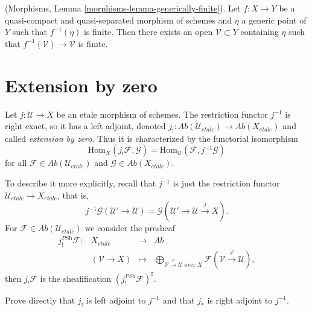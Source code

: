 \begin{lemma}
\label{lemma-generically-finite}
(Morphisms, Lemma \ref{morphisms-lemma-generically-finite}).
Let $f: X\to Y$ be a quasi-compact and quasi-separated morphism of schemes and
$\eta$ a generic point of $Y$ such that $f^{-1}(\eta)$ is finite. Then there
exists an open $\mathcal{V} \subset Y$ containing $\eta$ such that
$f^{-1}(\mathcal{V})\to \mathcal{V}$ is finite.
\end{lemma}






\section{Extension by zero}
\label{section-extension-by-zero}

\begin{definition}
\label{definition-extension-zero}
Let $j: \mathcal{U} \to X$ be an etale morphism of schemes. The restriction
functor $j^{-1}$ is right exact, so it has a left adjoint, denoted
$j_! : \textit{Ab}(\mathcal{U}_{etale})\to \textit{Ab}(X_{etale})$
and called {\it extension by zero}.
Thus it is characterized by the functorial isomorphism
$$
\text{Hom}_X(j_!\mathcal{F}, \mathcal{G}) =
\text{Hom}_\mathcal{U}(\mathcal{F}, j^{-1}\mathcal{G})
$$
for all $\mathcal{F} \in \textit{Ab}(\mathcal{U}_{etale})$ and
$\mathcal{G} \in \textit{Ab}(X_{etale})$.
\end{definition}

\noindent
To describe it more explicitly, recall that $j^{-1}$ is just the restriction
functor $\mathcal{U}_{etale}\to X_{etale}$, that is,
$$
j^{-1}\mathcal{G}(\mathcal{U}'\to \mathcal{U}) = \mathcal{G}
\left(\mathcal{U}'\to \mathcal{U} \xrightarrow{j} X\right).
$$
For $\mathcal{F} \in \textit{Ab}(\mathcal{U}_{etale})$ we consider the presheaf
$$
\begin{matrix}
j_!^{\textit{PSh}}\mathcal{F}: & X_{etale} &\longrightarrow & \textit{Ab}\\
& (\mathcal{V}\to X) & \longmapsto & \displaystyle
\bigoplus_{\mathcal{V}\xrightarrow{\varphi} \mathcal{U}\text{ over }X}
\mathcal{F}(\mathcal{V}\xrightarrow{\varphi}\mathcal{U}),
\end{matrix}
$$
then $j_!\mathcal{F}$ is the sheafification
$\left(j_!^{\textit{PSh}}\mathcal{F}\right)^\sharp$.

\begin{exercise}
\label{exercise-jshriek-direct}
Prove directly that $j_!$ is left adjoint to $j^{-1}$ and that $j_*$ is right
adjoint to $j^{-1}$.
\end{exercise}

